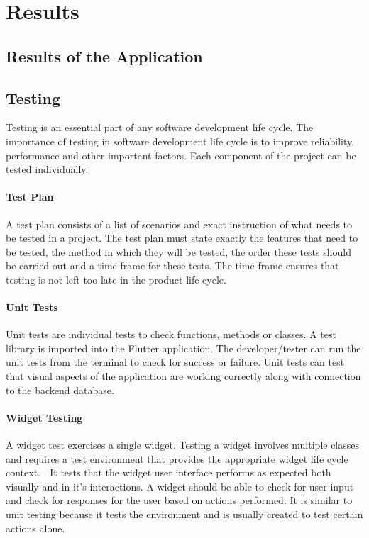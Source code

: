 \chapter{Results}
\section{Results of the Application}

\section{Testing}
Testing is an essential part of any software development life cycle. The importance of testing in software development life cycle is to improve reliability, performance and other important factors.\cite{TestingLifeCycle} Each component of the project can be tested individually.

\subsubsection{Test Plan}
A test plan consists of a list of scenarios and exact instruction of what needs to be tested in a project. The test plan must state exactly the features that need to be tested, the method in which they will be tested, the order these tests should be carried out and a time frame for these tests. The time frame ensures that testing is not left too late in the product life cycle.\cite{testPlan}
 
\subsubsection{Unit Tests}

Unit tests are individual tests to check functions, methods or classes. A test library is imported into the Flutter application. The developer/tester can run the unit tests from the terminal to check for success or failure. Unit tests can test that visual aspects of the application are working correctly along with connection to the backend database.

\subsubsection{Widget Testing}

A widget test exercises a single widget. Testing a widget involves multiple classes and requires a test environment that provides the appropriate widget life cycle context. \cite{testing}. It tests that the widget user interface performs as expected both visually and in it’s interactions. A widget should be able to check for user input and check for responses for the user based on actions performed. It is similar to unit testing because it tests the environment and is usually created to test certain actions alone.

